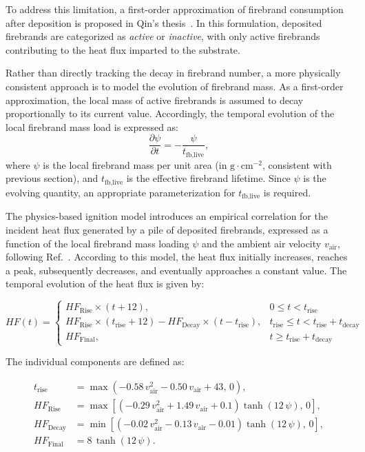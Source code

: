 To address this limitation, a first-order approximation of firebrand consumption after deposition is proposed in Qin's thesis~\cite{qinPhysicsBasedEulerianFramework2025}. In this formulation, deposited firebrands are categorized as \emph{active} or \emph{inactive}, with only active firebrands contributing to the heat flux imparted to the substrate.

Rather than directly tracking the decay in firebrand number, a more physically consistent approach is to model the evolution of firebrand mass. As a first-order approximation, the local mass of active firebrands is assumed to decay proportionally to its current value. Accordingly, the temporal evolution of the local firebrand mass load is expressed as:
\begin{equation}
    \frac{\partial \psi}{\partial t} = -\frac{\psi}{t_{\text{fb,live}}},
\end{equation}
where $\psi$ is the local firebrand mass per unit area (in $\mathrm{g\cdot cm^{-2}}$, consistent with previous section), and $t_{\text{fb,live}}$ is the effective firebrand lifetime. Since $\psi$ is the evolving quantity, an appropriate parameterization for $t_{\text{fb,live}}$ is required.

The physics-based ignition model introduces an empirical correlation for the incident heat flux generated by a pile of deposited firebrands, expressed as a function of the local firebrand mass loading $\psi$ and the ambient air velocity $v_{\text{air}}$, following Ref.~\cite{debeerEmpiricalFirebrandPile2023}. According to this model, the heat flux initially increases, reaches a peak, subsequently decreases, and eventually approaches a constant value. The temporal evolution of the heat flux is given by:

\begin{equation}\label{eq:firebrand_heat_flux}
HF(t) = 
\begin{cases}
HF_{\text{Rise}} \times (t + 12), & 0 \leq t < t_{\text{rise}} \\[6pt]
HF_{\text{Rise}} \times (t_{\text{rise}} + 12) - HF_{\text{Decay}} \times (t - t_{\text{rise}}), & t_{\text{rise}} \leq t < t_{\text{rise}} + t_{\text{decay}} \\[6pt]
HF_{\text{Final}}, & t \geq t_{\text{rise}} + t_{\text{decay}}
\end{cases}
\end{equation}

The individual components are defined as:

\begin{equation}\label{eq:firebrand_heat_flux_components}
\begin{aligned}
t_{\text{rise}} &= \max\!\left(-0.58\,v_{\text{air}}^2 - 0.50\,v_{\text{air}} + 43,\, 0\right), \\
HF_{\text{Rise}} &= \max\!\left[\left(-0.29\,v_{\text{air}}^2 + 1.49\,v_{\text{air}} + 0.1\right)\tanh(12\,\psi),\, 0\right], \\
HF_{\text{Decay}} &= \min\!\left[\left(-0.02\,v_{\text{air}}^2 - 0.13\,v_{\text{air}} - 0.01\right)\tanh(12\,\psi),\, 0\right], \\
HF_{\text{Final}} &= 8\,\tanh(12\,\psi).
\end{aligned}
\end{equation}

